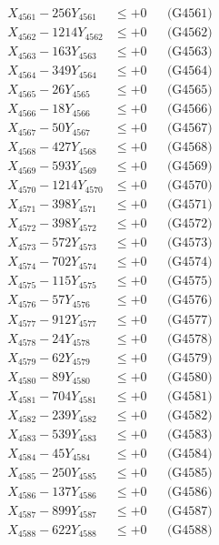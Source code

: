 \documentclass[a4paper,10pt]{article}
\begin{document}
{\begin{align}
\allowbreak
X_{4561} - 256Y_{4561} &\leq +0 && \text{(G4561)} \\
X_{4562} - 1214Y_{4562} &\leq +0 && \text{(G4562)} \\
X_{4563} - 163Y_{4563} &\leq +0 && \text{(G4563)} \\
X_{4564} - 349Y_{4564} &\leq +0 && \text{(G4564)} \\
X_{4565} - 26Y_{4565} &\leq +0 && \text{(G4565)} \\
X_{4566} - 18Y_{4566} &\leq +0 && \text{(G4566)} \\
X_{4567} - 50Y_{4567} &\leq +0 && \text{(G4567)} \\
X_{4568} - 427Y_{4568} &\leq +0 && \text{(G4568)} \\
X_{4569} - 593Y_{4569} &\leq +0 && \text{(G4569)} \\
X_{4570} - 1214Y_{4570} &\leq +0 && \text{(G4570)} \\
\allowbreak
X_{4571} - 398Y_{4571} &\leq +0 && \text{(G4571)} \\
X_{4572} - 398Y_{4572} &\leq +0 && \text{(G4572)} \\
X_{4573} - 572Y_{4573} &\leq +0 && \text{(G4573)} \\
X_{4574} - 702Y_{4574} &\leq +0 && \text{(G4574)} \\
X_{4575} - 115Y_{4575} &\leq +0 && \text{(G4575)} \\
X_{4576} - 57Y_{4576} &\leq +0 && \text{(G4576)} \\
X_{4577} - 912Y_{4577} &\leq +0 && \text{(G4577)} \\
X_{4578} - 24Y_{4578} &\leq +0 && \text{(G4578)} \\
X_{4579} - 62Y_{4579} &\leq +0 && \text{(G4579)} \\
X_{4580} - 89Y_{4580} &\leq +0 && \text{(G4580)} \\
\allowbreak
X_{4581} - 704Y_{4581} &\leq +0 && \text{(G4581)} \\
X_{4582} - 239Y_{4582} &\leq +0 && \text{(G4582)} \\
X_{4583} - 539Y_{4583} &\leq +0 && \text{(G4583)} \\
X_{4584} - 45Y_{4584} &\leq +0 && \text{(G4584)} \\
X_{4585} - 250Y_{4585} &\leq +0 && \text{(G4585)} \\
X_{4586} - 137Y_{4586} &\leq +0 && \text{(G4586)} \\
X_{4587} - 899Y_{4587} &\leq +0 && \text{(G4587)} \\
X_{4588} - 622Y_{4588} &\leq +0 && \text{(G4588)} \\

\end{align}}
\end{document}
